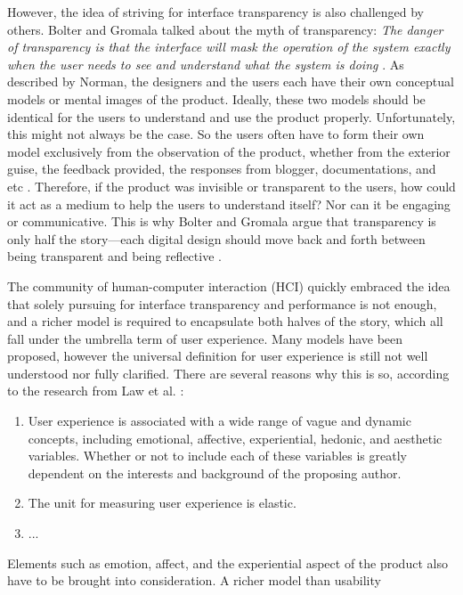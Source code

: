 \documentclass{acm_proc_article-sp}
\begin{document}
However, the idea of striving for interface transparency is also
challenged by others. Bolter and Gromala talked about the myth of
transparency: \textit{The danger of transparency is that the interface
  will mask the operation of the system exactly when the user needs to
  see and understand what the system is doing}
\cite{windows:bolter}. As described by Norman, the designers and the
users each have their own conceptual models or mental images of the
product. Ideally, these two models should be identical for the users
to understand and use the product properly. Unfortunately, this might
not always be the case. So the users often have to form their own
model exclusively from the observation of the product, whether from
the exterior guise, the feedback provided, the responses from blogger,
documentations, and etc \cite{design:norman}. Therefore, if the
product was invisible or transparent to the users, how could it act as
a medium to help the users to understand itself? Nor can it be
engaging or communicative. This is why Bolter and Gromala argue that
transparency is only half the story---each digital design should move
back and forth between being transparent and being reflective
\cite{windows:bolter}.

The community of human-computer interaction (HCI) quickly embraced the
idea that solely pursuing for interface transparency and performance
is not enough, and a richer model is required to encapsulate both
halves of the story, which all fall under the umbrella term of user
experience. Many models have been proposed, however the universal
definition for user experience is still not well understood nor fully
clarified. There are several reasons why this is so, according to the
research from Law et al. \cite{ux:law}:
\begin{enumerate}
  \item User experience is associated with a wide range of vague and
    dynamic concepts, including emotional, affective, experiential,
    hedonic, and aesthetic variables. Whether or not to include each
    of these variables is greatly dependent on the interests and
    background of the proposing author.
  \item The unit for measuring user experience is elastic.
  \item ...
\end{enumerate}

Elements such as emotion, affect, and the experiential
aspect of the product also have to be brought into consideration. A
richer model than usability
\end{document}
